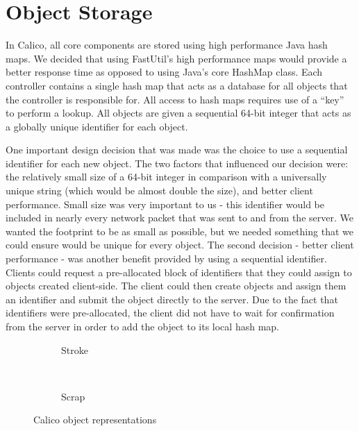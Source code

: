 \section{Object Storage}
In Calico, all core components are stored using high performance Java hash maps. 
We decided that using FastUtil's\cite{fastutil} high performance maps would provide a better response time as opposed to using Java's core HashMap class. 
Each controller contains a single hash map that acts as a database for all objects that the controller is responsible for.
All access to hash maps requires use of a ``key'' to perform a lookup.
All objects are given a sequential 64-bit integer that acts as a globally unique identifier for each object.

One important design decision that was made was the choice to use a sequential identifier for each new object. The two factors that influenced our decision were: the relatively small size of a 64-bit integer in comparison with a universally unique string (which would be almost double the size), and better client performance.
Small size was very important to us - this identifier would be included in nearly every network packet that was sent to and from the server. We wanted the footprint to be as small as possible, but we needed something that we could ensure would be unique for every object. 
The second decision - better client performance - was another benefit provided by using a sequential identifier. Clients could request a pre-allocated block of identifiers that they could assign to objects created client-side. The client could then create objects and assign them an identifier and submit the object directly to the server. Due to the fact that identifiers were pre-allocated, the client did not have to wait for confirmation from the server in order to add the object to its local hash map.


\begin{figure}[h!]
  \centering
  \begin{subfigure}[t]{0.4\textwidth}
    \centering
    \small
    
    \normalsize
    \caption{Stroke}
    \label{code:stroke_storage}
  \end{subfigure}%
  ~ 
  \begin{subfigure}[t]{0.4\textwidth}
    \centering
    \small
    
    \normalsize
    \caption{Scrap}
    \label{code:scrap_storage}
  \end{subfigure}
  \caption{Calico object representations}
  \label{code:storage}
\end{figure}

